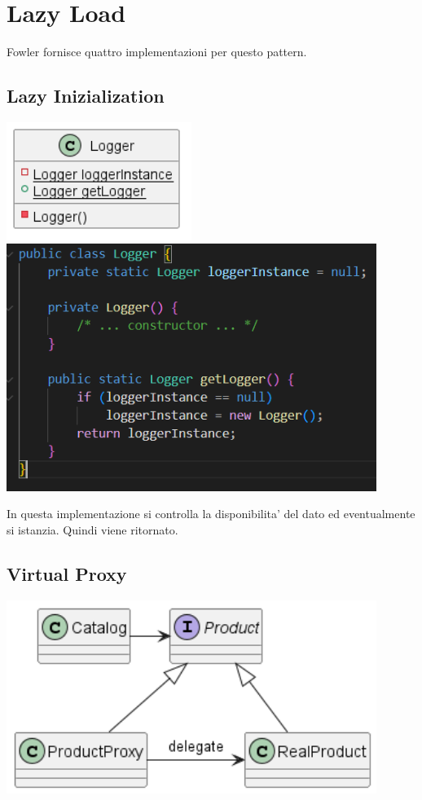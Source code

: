 \chapter{Lazy Load}

Fowler fornisce quattro implementazioni per questo pattern.

\section{Lazy Inizialization}

\begin{center}
    \includegraphics[width=6cm]{images/lazy-load/LoggerUML.png}
    \includegraphics[width=12cm]{images/lazy-load/Logger.png}
\end{center}

In questa implementazione si controlla la disponibilita' del dato ed eventualmente si istanzia. Quindi viene ritornato.

\section{Virtual Proxy}

\begin{center}
    \includegraphics[width=12cm]{images/lazy-load/VirtualProxy.png}
\end{center}

